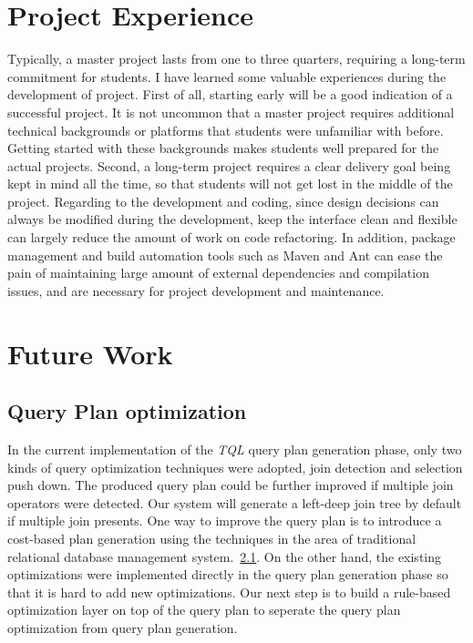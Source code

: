 \documentclass[conference, twocolumn, 11pt]{IEEEtran}
\theoremstyle{definition}
\begin{document}
\section{Project Experience}\label{proj-exp}
Typically, a master project lasts from one to three quarters, requiring a long-term commitment for students. I have learned some valuable experiences during the development of project. First of all, starting early will be a good indication of a successful project. It is not uncommon that a master project requires additional technical backgrounds or platforms that students were unfamiliar with before. Getting started with these backgrounds makes students well prepared for the actual projects. Second, a long-term project requires a clear delivery goal being kept in mind all the time, so that students will not get lost in the middle of the project. Regarding to the development and coding, since design decisions can always be modified during the development, keep the interface clean and flexible can largely reduce the amount of work on code refactoring. In addition, package management and build automation tools such as Maven and Ant can ease the pain of maintaining large amount of external dependencies and compilation issues, and are necessary for project development and maintenance.

\section{Future Work}\label{future-work}
\subsection{Query Plan optimization}
In the current implementation of the \emph{TQL} query plan generation phase, only two kinds of query optimization techniques were adopted, join detection and selection push down.
The produced query plan could be further improved if multiple join operators were detected. Our system will generate a left-deep join tree by default if multiple join presents.
One way to improve the query plan is to introduce a cost-based plan generation using the techniques in the area of traditional relational database management system.~\ref{}. On
the other hand, the existing optimizations were implemented directly in the query plan generation phase so that it is hard to add new optimizations. Our next step is to build a
rule-based optimization layer on top of the query plan to seperate the query plan optimization from query plan generation.
\end{document}

